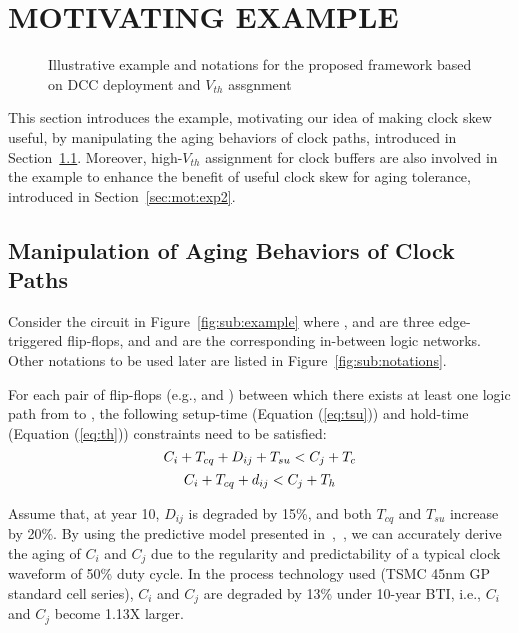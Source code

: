 \section{MOTIVATING EXAMPLE}
\label{sec:motivate}
\begin{figure*}[!ht]
    \centering
    \hspace{1.6cm}
    \caption{Illustrative example and notations for the proposed framework based on DCC deployment and $V_{th}$ assgnment}
    \label{fig:en}
\end{figure*}


This section introduces the example, motivating our idea of making clock skew useful, by manipulating the aging behaviors of clock paths, introduced in Section~\ref{sec:mot:exp1}. Moreover, high-$V_{th}$ assignment for clock buffers are also involved in the example to enhance the benefit of useful clock skew for aging tolerance, introduced in Section~\ref{sec:mot:exp2}. 

\subsection{Manipulation of Aging Behaviors of Clock Paths}
\label{sec:mot:exp1}
Consider the circuit in Figure~\ref{fig:sub:example} where ,  and  are three edge-triggered flip-flops, and  and  are the corresponding in-between logic networks. Other notations to be used later are listed in Figure~\ref{fig:sub:notations}.

For each pair of flip-flops (e.g.,  and ) between which there exists at least one logic path from  to , the following setup-time (Equation (\ref{eq:tsu})) and hold-time (Equation (\ref{eq:th})) constraints need to be satisfied:
\begin{equation}
	\fontsize{9}{9.6} C_i+T_{cq}+D_{ij}+T_{su}<C_j+T_c
	\label{eq:tsu}
\end{equation}
\begin{equation}
	\fontsize{9}{9.6} C_i+T_{cq}+d_{ij}<C_j+T_h
	\label{eq:th}
\end{equation}

Assume that, at year 10, $D_{ij}$ is degraded by 15\%, and both $T_{cq}$ and $T_{su}$ increase by 20\%. By using the predictive model presented in~\cite{wang2010impact},~\cite{wang2007efficient}, we can accurately derive the aging of $C_i$ and $C_j$ due to the regularity and predictability of a typical clock waveform of 50\% duty cycle. In the process technology used (TSMC 45nm GP standard cell series), $C_i$ and $C_j$ are degraded by 13\% under 10-year BTI, i.e., $C_i$ and $C_j$ become 1.13X larger.

